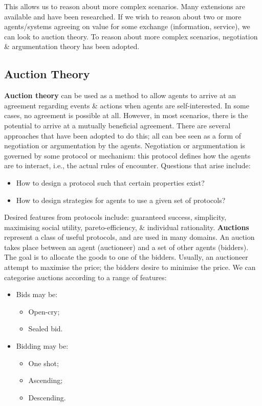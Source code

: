 \documentclass[a4paper,11pt]{article}
\begin{document}
This allows us to reason about more complex scenarios.
Many extensions are available and have been researched.
If we wish to reason about two or more agents/systems agreeing on value for some exchange (information, service), we can look to auction theory.
To reason about more complex scenarios, negotiation \& argumentation theory has been adopted.

\subsection{Auction Theory}
\textbf{Auction theory} can be used as a method to allow agents to arrive at an agreement regarding events \& actions when agents are self-interested.
In some cases, no agreement is possible at all.
However, in most scenarios, there is the potential to arrive at a mutually beneficial agreement.
There are several approaches that have been adopted to do this;
all can bee seen as a form of negotiation or argumentation by the agents.
Negotiation or argumentation is governed by some protocol or mechanism:
this protocol defines how the agents are to interact, i.e., the actual rules of encounter.
Questions that arise include:
\begin{itemize}
    \item   How to design a protocol such that certain properties exist?
    \item   How to design strategies for agents to use a given set of protocols?
\end{itemize}

Desired features from protocols include: guaranteed success, simplicity, maximising social utility, pareto-efficiency, \& individual rationality.
\textbf{Auctions} represent a class of useful protocols, and are used in many domains.
An auction takes place between an agent (auctioneer) and a set of other agents (bidders).
The goal is to allocate the goods to one of the bidders.
Usually, an auctioneer attempt to maximise the price;
the bidders desire to minimise the price.
We can categorise auctions according to a range of features:
\begin{itemize}
    \item   Bids may be:
            \begin{itemize}
                \item   Open-cry;
                \item   Sealed bid.
            \end{itemize}

    \item   Bidding may be:
            \begin{itemize}
                \item   One shot;
                \item   Ascending;
                \item   Descending.
            \end{itemize}
\end{itemize}
\end{document}
